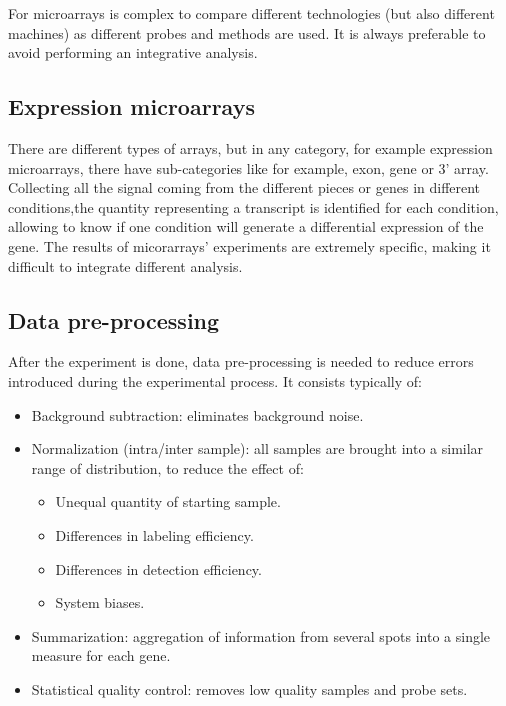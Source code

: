 	For microarrays is complex to compare different technologies (but also different machines) as different probes and methods are used.
	It is always preferable to avoid performing an integrative analysis.

	\subsection{Expression microarrays}
	There are different types of arrays, but in any category, for example expression microarrays, there have sub-categories like for example, exon, gene or 3' array.
	Collecting all the signal coming from the different pieces or genes in different conditions,the quantity representing a transcript is identified for each condition, allowing to know if one condition will generate a differential expression of the gene.
	The results of micorarrays' experiments are extremely specific, making it difficult to integrate different analysis.

	\subsection{Data pre-processing}
	After the experiment is done, data pre-processing is needed to reduce errors introduced during the experimental process.
	It consists typically of:

		\begin{itemize}
			\item Background subtraction: eliminates background noise.
			\item Normalization (intra/inter sample): all samples are brought into a similar range of distribution, to reduce the effect of:

				\begin{itemize}
					\item Unequal quantity of starting sample.
					\item Differences in labeling efficiency.
					\item Differences in detection efficiency.
					\item System biases.
				\end{itemize}

			\item Summarization: aggregation of information from several spots into a single measure for each gene.
			\item Statistical quality control: removes low quality samples and probe sets.

		\end{itemize}


